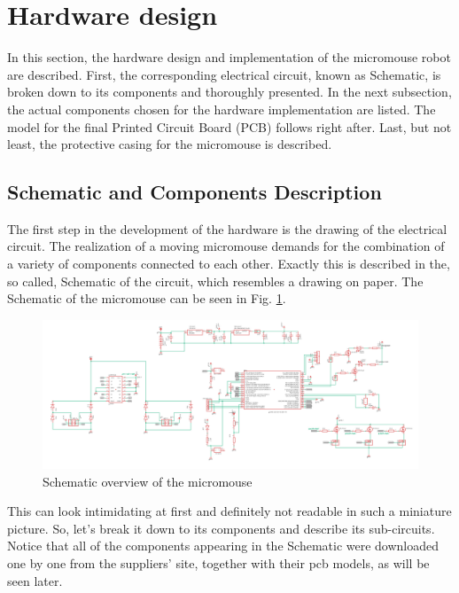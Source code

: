\section{Hardware design} \label{chap:hardware}

In this section, the hardware design and implementation of the micromouse robot are described. First, the corresponding electrical circuit, known as Schematic, is broken down to its components and thoroughly presented. In the next subsection, the actual components chosen for the hardware implementation are listed. The model for the final Printed Circuit Board (PCB) follows right after. Last, but not least, the protective casing for the micromouse is described.

\vspace{1cm}

\subsection{Schematic and Components Description}

The first step in the development of the hardware is the drawing of the electrical circuit. The realization of a moving micromouse demands for the combination of a variety of components connected to each other. Exactly this is described in the, so called, Schematic of the circuit, which resembles a drawing on paper. 
The Schematic of the micromouse can be seen in Fig. \ref{fig:schematic_overview}.

\begin{figure}[htb]
    \centering
    \includegraphics[width=1\textwidth]{figures/hardware/Schematic.PNG}
    \caption{Schematic overview of the micromouse}
    \label{fig:schematic_overview}
\end{figure}

This can look intimidating at first and definitely not readable in such a miniature picture. So, let's break it down to its components and describe its sub-circuits. Notice that all of the components appearing in the Schematic were downloaded one by one from the suppliers' site, together with their pcb models, as will be seen later.

